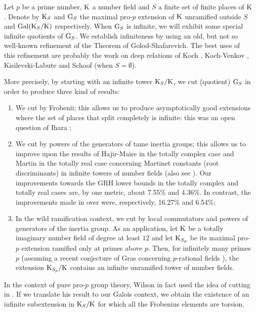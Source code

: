 \documentclass[12pt,a4paper,twoside,english]{smfart}
\def\G{{\rm G}}
\def\K{{\rm K}}
\def\Gal{{\rm Gal}}
\begin{document}
Let $p$ be a prime number, 
 $\K$ a number field and $S$ a finite set of  finite places of $\K$. Denote by $\K_S$ and $\G_S$ the maximal pro-$p$ extension of $\K$ unramified outside $S$ 
and  $\Gal(\K_S/\K)$ respectively.
When $\G_S$ is infinite, we will exhibit some special infinite quotients  of $\G_S$. We establish infiniteness by using 
 an old, but not so well-known 
 refinement of the Theorem of Golod-Shafarevich.
The best uses of this refinement
are probably the work on deep relations of
Koch \cite[Chapter 12]{Koch}, Koch-Venkov \cite{Koch-Venkov}, Kisilevski-Labute \cite{Kisilevski-Labute} and Schoof \cite{Schoof} (when $S=\emptyset$).  

 

\smallskip

More precisely, by starting with an infinite tower $\K_S/\K$, we cut (quotient) $\G_S$ in order to produce three kind of results:
\begin{enumerate}
\item[$(i)$]  We cut by  Frobenii; this allows us to produce asymptotically good extensions where the set of places
that split completely  is infinite: this was an open question of  Ihara \cite{Ihara};
\item[$(ii)$]  We cut by powers of the generators of tame inertia groups; this allows us to improve upon the results of  Hajir-Maire   \cite{Hajir-Maire-JSC} in the totally
complex case 
and Martin \cite{Martin} in the totally real case concerning Martinet constants 
(root discriminants) 
in infinite towers of number fields (also see \cite{Martinet}). Our improvements towards the GRH lower bounds in the totally complex and totally real cases are, by one metric, about 7.55\% and 4.36\%. \color{black}
In contrast, the improvements made
in \cite{Hajir-Maire-JSC} over \cite{Martinet} were, respectively, 16.27\% and 6.54\%;
\item[$(iii)$] In the wild ramification context, we cut by   local commutators and  powers of  generators of the inertia group. 
As an application, let $\K$ be a  totally imaginary number field of degree at least $12$ and let $\K_{S_p}$ be its maximal pro-$p$ extension
ramified only at primes above $p$.   Then, for infinitely many primes $p$ (assuming  a recent conjecture of Gras concerning $p$-rational fields \cite{Gras-CJM}), the extension $\K_{S_p}/\K$ contains an infinite unramified tower of number fields.
\end{enumerate}

In  the context of pure pro-$p$ group theory,  Wilson in fact   used the idea of cutting in \cite{Wilson}. If we translate his result to our Galois context, we  obtain  the existence of 
an infinite subextension in $\K_S/\K$ for which  all the Frobenius elements are torsion.  
\end{document}
